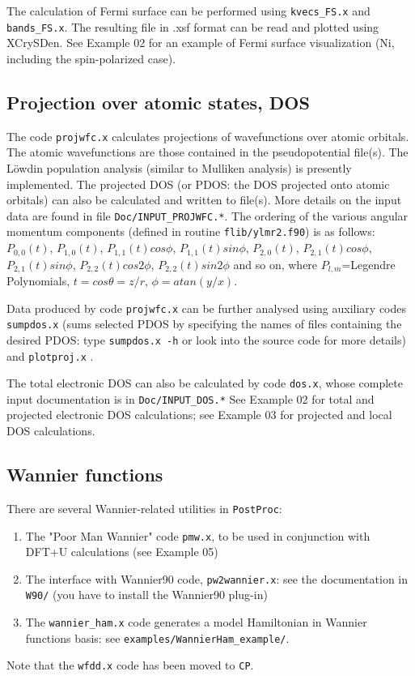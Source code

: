 \documentclass[12pt,a4paper]{article}
\def\CP{\texttt{CP}}
\def\PostProc{\texttt{PostProc}}
\begin{document}
The calculation of Fermi surface can be performed using 
\texttt{kvecs\_FS.x} and
\texttt{bands\_FS.x}. The resulting file in .xsf format can be read and plotted
using XCrySDen. See Example 02 for an example of Fermi surface 
visualization (Ni, including the spin-polarized case).

\subsection{Projection over atomic states, DOS}

The code \texttt{projwfc.x} calculates projections of wavefunctions
over atomic orbitals. The atomic wavefunctions are those contained
in the pseudopotential file(s). The L\"owdin population analysis (similar to
Mulliken analysis) is presently implemented. The projected DOS (or PDOS:
the DOS projected onto atomic orbitals) can also be calculated and written
to file(s). More details on the input data are found in file
\texttt{Doc/INPUT\_PROJWFC.*}. The ordering of the various 
angular momentum components (defined in routine \texttt{flib/ylmr2.f90})
is as follows:
$P_{0,0}(t)$, $P_{1,0}(t)$, $P_{1,1}(t)cos\phi$, $P_{1,1}(t)sin\phi$,
 $P_{2,0}(t)$, $P_{2,1}(t)cos\phi$, $P_{2,1}(t)sin\phi$, 
 $P_{2,2}(t)cos2\phi$, $P_{2,2}(t)sin2\phi$
and so on, where $P_{l,m}$=Legendre Polynomials, 
$t = cos\theta = z/r$, $\phi= atan(y /x)$.

Data produced by code \texttt{projwfc.x} can be further 
analysed using auxiliary codes \texttt{sumpdos.x} (sums selected PDOS
by specifying the names of files containing the desired PDOS: type 
\texttt{sumpdos.x -h} or look into the source code for more details) 
and \texttt{plotproj.x} . 

The total electronic DOS can also be calculated by code \texttt{dos.x},
whose complete input documentation is in \texttt{Doc/INPUT\_DOS.*}
See Example 02 for total and projected electronic DOS calculations;
see Example 03 for projected and local DOS calculations.

\subsection{Wannier functions}

There are several Wannier-related utilities in \PostProc:
\begin{enumerate}
\item The "Poor Man Wannier" code \texttt{pmw.x}, to be used
in conjunction with DFT+U calculations (see Example 05)
\item The interface with Wannier90 code, \texttt{pw2wannier.x}:
see the documentation in \texttt{W90/} (you have to install the 
Wannier90 plug-in)
\item The \texttt{wannier\_ham.x} code generates a model Hamiltonian 
in Wannier functions basis: see \texttt{examples/WannierHam\_example/}.
\end{enumerate}
Note that the \texttt{wfdd.x} code has been moved to \CP.
\end{document}
